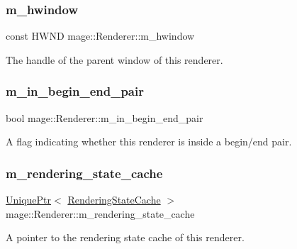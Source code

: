 \subsubsection{\texorpdfstring{m\+\_\+hwindow}{m\_hwindow}}
{\footnotesize\ttfamily const H\+W\+ND mage\+::\+Renderer\+::m\+\_\+hwindow\hspace{0.3cm}{\ttfamily [private]}}

The handle of the parent window of this renderer. \hypertarget{classmage_1_1_renderer_a3caa1bad6cbfde8f87f807e5c97924e3}{}\label{classmage_1_1_renderer_a3caa1bad6cbfde8f87f807e5c97924e3} 
\subsubsection{\texorpdfstring{m\+\_\+in\+\_\+begin\+\_\+end\+\_\+pair}{m\_in\_begin\_end\_pair}}
{\footnotesize\ttfamily bool mage\+::\+Renderer\+::m\+\_\+in\+\_\+begin\+\_\+end\+\_\+pair\hspace{0.3cm}{\ttfamily [private]}}

A flag indicating whether this renderer is inside a begin/end pair. \hypertarget{classmage_1_1_renderer_a3d9f823ecef314a974c4cdb3a71a1853}{}\label{classmage_1_1_renderer_a3d9f823ecef314a974c4cdb3a71a1853} 
\subsubsection{\texorpdfstring{m\+\_\+rendering\+\_\+state\+\_\+cache}{m\_rendering\_state\_cache}}
{\footnotesize\ttfamily \hyperlink{namespacemage_a3316d7143a973e37adf1110f2e80ca31}{Unique\+Ptr}$<$ \hyperlink{structmage_1_1_rendering_state_cache}{Rendering\+State\+Cache} $>$ mage\+::\+Renderer\+::m\+\_\+rendering\+\_\+state\+\_\+cache\hspace{0.3cm}{\ttfamily [private]}}

A pointer to the rendering state cache of this renderer. \hypertarget{classmage_1_1_renderer_a86ed436120830cef3e0173f85550aa50}{}\label{classmage_1_1_renderer_a86ed436120830cef3e0173f85550aa50} 
